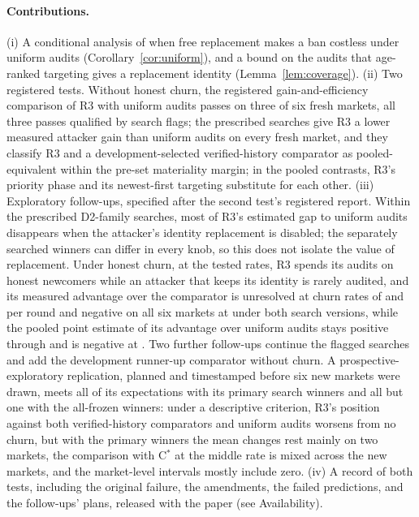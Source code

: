 \documentclass[11pt]{article}
\begin{document}
\paragraph{Contributions.} (i) A conditional analysis of when free replacement makes a ban costless under uniform audits (Corollary~\ref{cor:uniform}), and a bound on the audits that age-ranked targeting gives a replacement identity (Lemma~\ref{lem:coverage}). (ii) Two registered tests. Without honest churn, the registered gain-and-efficiency comparison of R3 with uniform audits passes on three of six fresh markets, all three passes qualified by search flags; the prescribed searches give R3 a lower measured attacker gain than uniform audits on every fresh market, and they classify R3 and a development-selected verified-history comparator as pooled-equivalent within the pre-set materiality margin; in the pooled contrasts, R3's priority phase and its newest-first targeting substitute for each other. (iii) Exploratory follow-ups, specified after the second test's registered report. Within the prescribed D2-family searches, most of R3's estimated gap to uniform audits disappears when the attacker's identity replacement is disabled; the separately searched winners can differ in every knob, so this does not isolate the value of replacement. Under honest churn, at the tested rates, R3 spends its audits on honest newcomers while an attacker that keeps its identity is rarely audited, and its measured advantage over the comparator is unresolved at churn rates of  and  per round and negative on all six markets at  under both search versions, while the pooled point estimate of its advantage over uniform audits stays positive through  and is negative at . Two further follow-ups continue the flagged searches and add the development runner-up comparator without churn. A prospective-exploratory replication, planned and timestamped before six new markets were drawn, meets all of its expectations with its primary search winners and all but one with the all-frozen winners: under a descriptive criterion, R3's position against both verified-history comparators and uniform audits worsens from no churn, but with the primary winners the mean changes rest mainly on two markets, the comparison with C$^*$ at the middle rate is mixed across the new markets, and the market-level intervals mostly include zero. (iv) A record of both tests, including the original failure, the amendments, the failed predictions, and the follow-ups' plans, released with the paper (see Availability).
\end{document}
